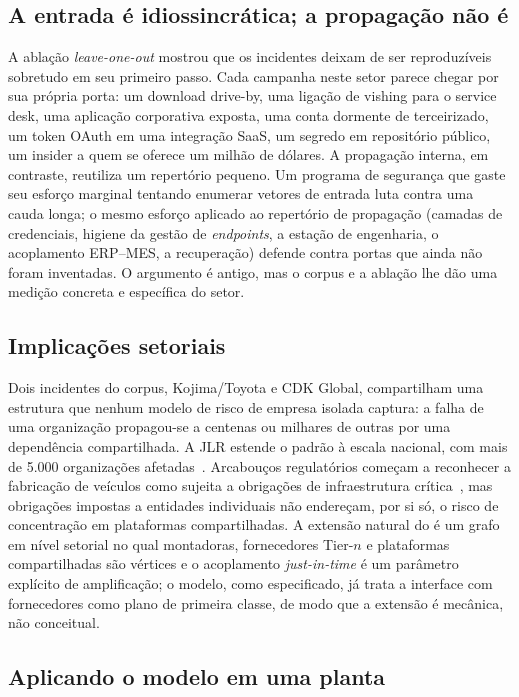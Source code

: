 \subsection{A entrada é idiossincrática; a propagação não é}

A ablação \emph{leave-one-out} mostrou que os incidentes deixam de ser
reproduzíveis sobretudo em seu primeiro passo. Cada campanha neste setor parece
chegar por sua própria porta: um download drive-by, uma ligação de vishing para
o service desk, uma aplicação corporativa exposta, uma conta dormente de
terceirizado, um token OAuth em uma integração SaaS, um segredo em repositório
público, um insider a quem se oferece um milhão de dólares. A propagação
interna, em contraste, reutiliza um repertório pequeno. Um programa de segurança
que gaste seu esforço marginal tentando enumerar vetores de entrada luta contra
uma cauda longa; o mesmo esforço aplicado ao repertório de propagação (camadas de credenciais, higiene da gestão de
\emph{endpoints}, a estação de engenharia, o acoplamento ERP--MES, a
recuperação) defende contra portas que
ainda não foram inventadas. O argumento é antigo, mas o corpus e a ablação lhe
dão uma medição concreta e específica do setor.

\subsection{Implicações setoriais}

Dois incidentes do corpus, Kojima/Toyota e CDK Global, compartilham uma
estrutura que nenhum modelo de risco de empresa isolada captura: a falha de uma
organização propagou-se a centenas ou milhares de outras por uma dependência
compartilhada. A JLR estende o padrão à escala nacional, com mais de 5.000
organizações afetadas~\cite{inc18cmc,inc18cw}. Arcabouços regulatórios começam a
reconhecer a fabricação de veículos como sujeita a obrigações de infraestrutura
crítica~\cite{nis2directive,cisacriticalmanufacturing}, mas obrigações impostas a
entidades individuais não endereçam, por si só, o risco de concentração em
plataformas compartilhadas. A extensão natural do \capm{} é um grafo em nível
setorial no qual montadoras, fornecedores Tier-$n$ e plataformas compartilhadas
são vértices e o acoplamento \emph{just-in-time} é um parâmetro explícito de
amplificação; o modelo, como especificado, já trata a interface com fornecedores
como plano de primeira classe, de modo que a extensão é mecânica, não
conceitual.

\subsection{Aplicando o modelo em uma planta}

